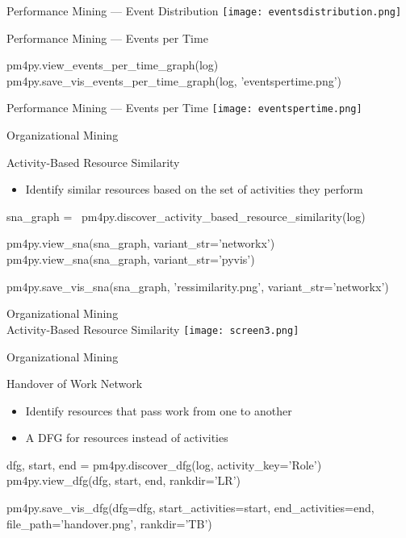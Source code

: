 \documentclass[ignorenonframetext,xcolor=x11names]{beamer}
\begin{document}
\begin{frame}{Performance Mining --- Event Distribution}
\centering
\texttt{[image: eventsdistribution.png]}
\end{frame}

\begin{frame}[fragile]{Performance Mining --- Events per Time}
\footnotesize
\begin{pythoncode}
pm4py.view_events_per_time_graph(log)
pm4py.save_vis_events_per_time_graph(log, 'eventspertime.png')
\end{pythoncode}
\end{frame}

\begin{frame}{Performance Mining --- Events per Time}
\centering
\texttt{[image: eventspertime.png]}
\end{frame}


\begin{frame}[fragile]{Organizational Mining}
\begin{block}{Activity-Based Resource Similarity}
\begin{itemize}
   \item Identify similar resources based on the set of activities they perform
\end{itemize}
\end{block}
\footnotesize
\begin{pythoncode}
sna_graph = \
 pm4py.discover_activity_based_resource_similarity(log)

pm4py.view_sna(sna_graph, variant_str='networkx')
pm4py.view_sna(sna_graph, variant_str='pyvis')

pm4py.save_vis_sna(sna_graph, 'ressimilarity.png',
    variant_str='networkx')
\end{pythoncode}
\end{frame}

\begin{frame}{Organizational Mining \\ \small Activity-Based Resource Similarity}
\centering
\texttt{[image: screen3.png]}
\end{frame}

\begin{frame}[fragile]{Organizational Mining}
\begin{block}{Handover of Work Network}
\begin{itemize}
   \item Identify resources that pass work from one to another
   \item A DFG for resources instead of activities
\end{itemize}
\end{block}
\footnotesize
\begin{pythoncode}
dfg, start, end = pm4py.discover_dfg(log, activity_key='Role')
pm4py.view_dfg(dfg, start, end, rankdir='LR')

pm4py.save_vis_dfg(dfg=dfg,
    start_activities=start, 
    end_activities=end, 
    file_path='handover.png', rankdir='TB')
\end{pythoncode}
\end{frame}
\end{document}
